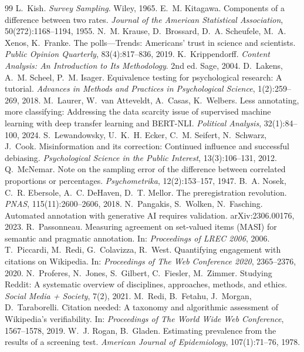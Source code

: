 \documentclass[10pt,a4paper]{article}
\begin{document}
\begin{thebibliography}{99}
 L.~Kish. \textit{Survey Sampling}. Wiley, 1965.
 E.~M. Kitagawa. Components of a difference between two rates. \textit{Journal of the American Statistical Association}, 50(272):1168--1194, 1955.
 N.~M. Krause, D.~Brossard, D.~A. Scheufele, M.~A. Xenos, K.~Franke. The polls---Trends: Americans' trust in science and scientists. \textit{Public Opinion Quarterly}, 83(4):817--836, 2019.
 K.~Krippendorff. \textit{Content Analysis: An Introduction to Its Methodology}. 2nd ed. Sage, 2004.
 D.~Lakens, A.~M. Scheel, P.~M. Isager. Equivalence testing for psychological research: A tutorial. \textit{Advances in Methods and Practices in Psychological Science}, 1(2):259--269, 2018.
 M.~Laurer, W.~van Atteveldt, A.~Casas, K.~Welbers. Less annotating, more classifying: Addressing the data scarcity issue of supervised machine learning with deep transfer learning and BERT-NLI. \textit{Political Analysis}, 32(1):84--100, 2024.
 S.~Lewandowsky, U.~K.~H. Ecker, C.~M. Seifert, N.~Schwarz, J.~Cook. Misinformation and its correction: Continued influence and successful debiasing. \textit{Psychological Science in the Public Interest}, 13(3):106--131, 2012.
 Q.~McNemar. Note on the sampling error of the difference between correlated proportions or percentages. \textit{Psychometrika}, 12(2):153--157, 1947.
 B.~A. Nosek, C.~R. Ebersole, A.~C. DeHaven, D.~T. Mellor. The preregistration revolution. \textit{PNAS}, 115(11):2600--2606, 2018.
 N.~Pangakis, S.~Wolken, N.~Fasching. Automated annotation with generative AI requires validation. arXiv:2306.00176, 2023.
 R.~Passonneau. Measuring agreement on set-valued items (MASI) for semantic and pragmatic annotation. In: \textit{Proceedings of LREC 2006}, 2006.
 T.~Piccardi, M.~Redi, G.~Colavizza, R.~West. Quantifying engagement with citations on Wikipedia. In: \textit{Proceedings of The Web Conference 2020}, 2365--2376, 2020.
 N.~Proferes, N.~Jones, S.~Gilbert, C.~Fiesler, M.~Zimmer. Studying Reddit: A systematic overview of disciplines, approaches, methods, and ethics. \textit{Social Media + Society}, 7(2), 2021.
 M.~Redi, B.~Fetahu, J.~Morgan, D.~Taraborelli. Citation needed: A taxonomy and algorithmic assessment of Wikipedia's verifiability. In: \textit{Proceedings of The World Wide Web Conference}, 1567--1578, 2019.
 W.~J. Rogan, B.~Gladen. Estimating prevalence from the results of a screening test. \textit{American Journal of Epidemiology}, 107(1):71--76, 1978.

\end{thebibliography}
\end{document}
